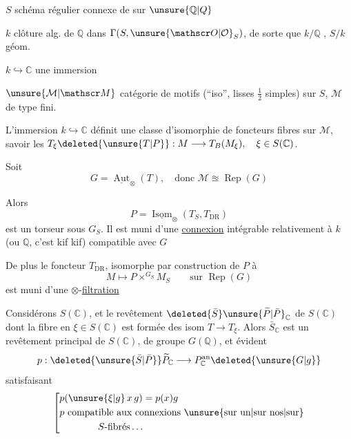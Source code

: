 $S$ schéma régulier connexe de  sur $\unsure{\mathbb Q|Q}$

$k$ clôture alg. de $\mathbb Q$ dans $\Gamma(S,\unsure{\mathscr O|\mathcal O}_S)$, de sorte que $k/\mathbb Q$ , $S/k$ géom. 

$k\hookrightarrow\mathbb C$ une immersion

$\unsure{\mathcal M|\mathscr M}$ catégorie de motifs (``iso'', lisses $\frac12$ simples) sur $S$, $\mathcal M$ de type fini.

L'immersion $k\hookrightarrow\mathbb C$ définit une classe d'isomorphie de foncteurs fibres sur $\mathcal M$, savoir les $T_{\xi}\deleted{\unsure{T|P}}:M\longrightarrow T_B(M_{\xi}),\quad \xi\in S(\mathbb C)$.

Soit  
\[
G=\underline{\operatorname{Aut}}_{\otimes}(T),\quad\text{donc }\mathcal M\approxeq\operatorname{Rep}(G)
\]

Alors
\[
P=\underline{\operatorname{Isom}}_{\otimes}(T_S,T_{\mathrm{DR}})
\]
est un torseur sous $G_S$. Il est muni d'une \uline{connexion} intégrable relativement à $k$ (ou $\mathbb Q$, c'est kif kif) compatible avec $G$

De plus le foncteur $T_{\mathrm{DR}}$, isomorphe par construction de $P$ à
\[
M\longmapsto P\mathbin{\times}^{G_S}M_S\qquad\text{sur }\operatorname{Rep}(G)
\]
est muni d'une $\otimes$-\uline{filtration}

 Considérons $S(\mathbb C)$, et le revêtement $\deleted{\bar S}\unsure{\widetilde P|\bar P}_{\mathbb C}$ de $S(\mathbb C)$ dont la fibre en $\xi\in S(\mathbb C)$ est formée des isom $T\longrightarrow T_{\xi}$. Alors $\bar S_{\mathbb C}$ est un revêtement principal de $S(\mathbb C)$, de groupe $G(\mathbb Q)$,  et      évident
\[
p:\deleted{\unsure{\bar S|\bar P}}\widetilde P_{\mathbb C}
\longrightarrow P_{\mathbb C}^{\mathrm{an}}\deleted{\unsure{G|g}}
\]
satisfaisant
\[
\left[\begin{aligned}
&p(\unsure{\xi|g}\,x\,g)=p(x)g\\
&p\ \text{compatible aux connexions \unsure{sur un|sur nos|sur}}\\
&\hspace{4em}S\text{-fibrés}\ldots
\end{aligned}\right.
\]

